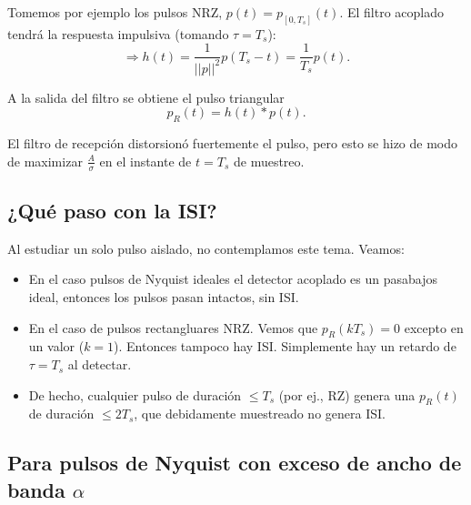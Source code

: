 Tomemos por ejemplo los pulsos NRZ, $p(t) = p_{[0,T_s]}(t)$. El
filtro acoplado tendrá la respuesta impulsiva (tomando
$\tau=T_s$):
\[
\Rightarrow h(t) = \dfrac{1}{||p||^2} p(T_s-t) =
\dfrac{1}{T_s}p(t).
\]
\begin{minipage}{0.6\textwidth}
 A la salida del filtro se obtiene el pulso triangular
 \[p_R(t)=h(t)\ast p(t). \]
\end{minipage}
\begin{minipage}{0.4\textwidth}
 \begin{center}
  \endpgfgraphicnamed
 \end{center}
\end{minipage}

El filtro de recepción distorsionó fuertemente el pulso, pero esto
se  hizo de modo de maximizar $\frac{A}{\sigma}$ en el instante de
$t=T_s$ de muestreo.


\subsection*{¿Qué paso con la ISI?}

Al estudiar un solo pulso aislado, no contemplamos este tema.
Veamos:
\begin{itemize}
 \item En el caso pulsos de Nyquist ideales el detector acoplado es un pasabajos ideal, entonces los pulsos pasan intactos,
 sin ISI.
 \item En el caso de pulsos rectangluares NRZ. Vemos que $p_R(k T_s) = 0$ excepto en un valor ($k=1$). Entonces tampoco hay
 ISI.  Simplemente hay un retardo de $\tau = T_s$ al detectar.
 \item  De hecho, cualquier pulso de duración $\leq T_s$ (por ej., RZ) genera una $p_R(t)$ de duración $\leq
 2T_s$, que debidamente muestreado no genera  ISI.
\end{itemize}


\subsection*{Para pulsos de Nyquist con exceso de ancho de banda
$\alpha$}

